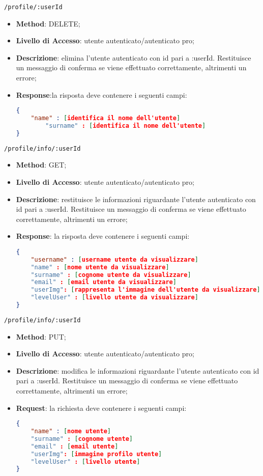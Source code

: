 \item \texttt{/profile/:userId}
	\begin{itemize}
		\item \textbf{Method}: DELETE;
		\item \textbf{Livello di Accesso}: utente autenticato/autenticato pro;
		\item \textbf{Descrizione}: elimina l'utente autenticato con id pari a :userId. 		Restituisce un messaggio di conferma se viene effettuato correttamente, altrimenti un errore;
		\item \textbf{Response}:la risposta deve contenere i seguenti campi:
\begin{lstlisting}[language=json,firstnumber=1]
{
   	"name" : [identifica il nome dell'utente]
    	"surname" : [identifica il nome dell'utente]
}
\end{lstlisting}
	\end{itemize}	
	
	\item \texttt{/profile/info/:userId}
		\begin{itemize}
			\item \textbf{Method}: GET;
			\item \textbf{Livello di Accesso}: utente autenticato/autenticato pro;
			\item \textbf{Descrizione}: restituisce le informazioni riguardante l'utente autenticato con id pari a :userId. Restituisce un messaggio di conferma se viene
effettuato correttamente, altrimenti un errore;
			\item \textbf{Response}: la risposta deve contenere i seguenti campi:
\begin{lstlisting}[language=json,firstnumber=1]
{
	"username" : [username utente da visualizzare]
	"name" : [nome utente da visualizzare]
	"surname" : [cognome utente da visualizzare]
	"email" : [email utente da visualizzare]
	"userImg": [rappresenta l'immagine dell'utente da visualizzare]
	"levelUser" : [livello utente da visualizzare]
}
\end{lstlisting}
		\end{itemize}
		
	\item \texttt{/profile/info/:userId}
		\begin{itemize}
			\item \textbf{Method}: PUT;
			\item \textbf{Livello di Accesso}: utente autenticato/autenticato pro;
			\item \textbf{Descrizione}: modifica le informazioni riguardante l'utente autenticato con id pari a :userId. Restituisce un messaggio di conferma se viene
effettuato correttamente, altrimenti un errore;
			\item \textbf{Request}: la richiesta deve contenere i seguenti campi:
\begin{lstlisting}[language=json,firstnumber=1]
{
	"name" : [nome utente]
	"surname" : [cognome utente]
	"email" : [email utente]
	"userImg": [immagine profilo utente]
	"levelUser" : [livello utente]
}
\end{lstlisting}
		\end{itemize}	
		
